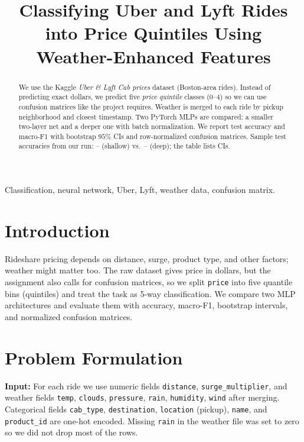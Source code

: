 \documentclass[conference]{IEEEtran}
\newcommand{\ShallowMLPAcc}{--}\newcommand{\ShallowMLPAccLo}{--}\newcommand{\ShallowMLPAccHi}{--}%
\newcommand{\DeepBatchNormMLPAcc}{--}\newcommand{\DeepBatchNormMLPAccLo}{--}\newcommand{\DeepBatchNormMLPAccHi}{--}%
\begin{document}
\title{Classifying Uber and Lyft Rides into Price Quintiles Using Weather-Enhanced Features}

\author{}

\maketitle

\begin{abstract}
We use the Kaggle \emph{Uber \& Lyft Cab prices} dataset (Boston-area rides). Instead of predicting exact dollars, we predict five \emph{price quintile} classes (0--4) so we can use confusion matrices like the project requires. Weather is merged to each ride by pickup neighborhood and closest timestamp. Two PyTorch MLPs are compared: a smaller two-layer net and a deeper one with batch normalization. We report test accuracy and macro-F1 with bootstrap $95\%$ CIs and row-normalized confusion matrices. Sample test accuracies from our run: \ShallowMLPAcc{} (shallow) vs.\ \DeepBatchNormMLPAcc{} (deep); the table lists CIs.
\end{abstract}

\begin{IEEEkeywords}
Classification, neural network, Uber, Lyft, weather data, confusion matrix.
\end{IEEEkeywords}

\section{Introduction}
Rideshare pricing depends on distance, surge, product type, and other factors; weather might matter too. The raw dataset gives price in dollars, but the assignment also calls for confusion matrices, so we split \texttt{price} into five quantile bins (quintiles) and treat the task as 5-way classification. We compare two MLP architectures and evaluate them with accuracy, macro-F1, bootstrap intervals, and normalized confusion matrices.

\section{Problem Formulation}
\textbf{Input:} For each ride we use numeric fields \texttt{distance}, \texttt{surge\_multiplier}, and weather fields \texttt{temp}, \texttt{clouds}, \texttt{pressure}, \texttt{rain}, \texttt{humidity}, \texttt{wind} after merging. Categorical fields \texttt{cab\_type}, \texttt{destination}, \texttt{location} (pickup), \texttt{name}, and \texttt{product\_id} are one-hot encoded. Missing \texttt{rain} in the weather file was set to zero so we did not drop most of the rows.
\end{document}
